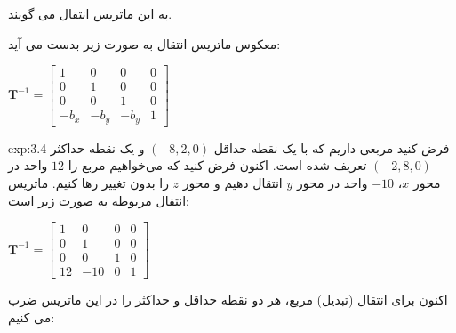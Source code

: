 {\begin{spacing}{1.5}
        به این ماتریس انتقال می گویند.

        معکوس ماتریس انتقال به صورت زیر بدست می آید:

        \begin{center}
            $\textbf{T}^{-1}=\begin{bmatrix}
                                 1      & 0      & 0      & 0 \\
                                 0      & 1      & 0      & 0 \\
                                 0      & 0      & 1      & 0 \\
                                 -b_{x} & -b_{y} & -b_{y} & 1
            \end{bmatrix}$
        \end{center}

        \begin{example}{exp:3.4}
            \Large
            فرض کنید مربعی داریم که با یک نقطه حداقل $(-8, 2, 0)$ و یک نقطه حداکثر $(-2, 8, 0)$ تعریف شده است.
            اکنون فرض کنید که می‌خواهیم مربع را $12$ واحد در محور $x$، $-10$ واحد در محور $y$ انتقال دهیم
            و محور $z$ را بدون تغییر رها کنیم.
            ماتریس انتقال مربوطه به صورت زیر است:

            \begin{center}
                $\textbf{T}^{-1}=\begin{bmatrix}
                                     1  & 0   & 0 & 0 \\
                                     0  & 1   & 0 & 0 \\
                                     0  & 0   & 1 & 0 \\
                                     12 & -10 & 0 & 1
                \end{bmatrix}$
            \end{center}

            اکنون برای انتقال (تبدیل) مربع، هر دو نقطه حداقل و حداکثر را در این ماتریس ضرب می کنیم:


\end{example}
\end{spacing}}
